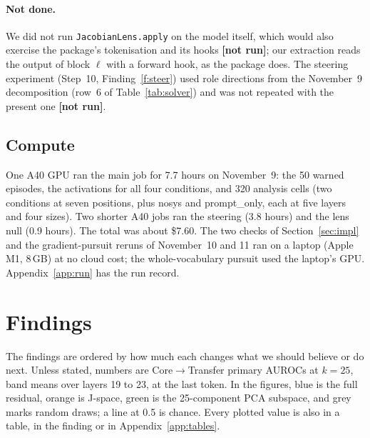 \documentclass[11pt]{article}
\newcommand{\notrun}{{\small\textbf{[not run]}}}
\newcounter{finding}
\begin{document}
\begin{table}[H]\centering\small

\caption{The J-space arm under different readings of the paper's definition. Core$\to$Transfer primary AUROC, original
condition, last token, $k=25$, per layer and as band mean. The last column is the paired 95\% bootstrap interval of the
band-mean difference to row~1. Rows~4 to~7 restrict the pursuit to a shortlist; row~6 is the J-space arm of the November~9
version of this paper.}
\label{tab:solver}
\end{table}



\paragraph{Not done.} We did not run \texttt{JacobianLens.apply} on the model itself, which would also exercise the
package's tokenisation and its hooks \notrun; our extraction reads the output of block $\ell$ with a forward hook, as the
package does. The steering experiment (Step~10, Finding~\ref{f:steer}) used role directions from the November~9
decomposition (row~6 of Table~\ref{tab:solver}) and was not repeated with the present one \notrun.

\subsection{Compute}
One A40 GPU ran the main job for 7.7 hours on November~9: the 50 warned episodes, the activations for all four conditions,
and 320 analysis cells (two conditions at seven positions, plus nosys and prompt\_only, each at five layers and four
sizes). Two shorter A40 jobs ran the steering (3.8 hours) and the lens null (0.9 hours). The total was about \$7.60. The
two checks of Section~\ref{sec:impl} and the gradient-pursuit reruns of November~10 and 11 ran on a laptop (Apple M1,
8\,GB) at no cloud cost; the whole-vocabulary pursuit used the laptop's GPU. Appendix~\ref{app:run} has the run record.

\section{Findings}\label{sec:findings}
The findings are ordered by how much each changes what we should believe or do next. Unless stated, numbers are
Core$\to$Transfer primary AUROCs at $k=25$, band means over layers 19 to 23, at the last token. In the figures, blue is the
full residual, orange is J-space, green is the 25-component PCA subspace, and grey marks random draws; a line at 0.5 is
chance. Every plotted value is also in a table, in the finding or in Appendix~\ref{app:tables}.
\end{document}
